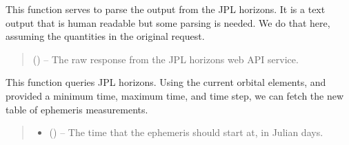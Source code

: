 \documentclass[letterpaper,11pt,english]{sphinxmanual}
\begin{document}
\begin{savenotes}
\begin{fulllineitems}
\begin{savenotes}\begin{fulllineitems}
\label{\detokenize{code/opihiexarata.ephemeris.jplhorizons:opihiexarata.ephemeris.jplhorizons.JPLHorizonsWebAPIEngine.__parse_jpl_horizons_output}}
\pysigstartsignatures
{}
\pysigstopsignatures
\sphinxAtStartPar
This function serves to parse the output from the JPL horizons. It
is a text output that is human readable but some parsing is needed.
We do that here, assuming the quantities in the original request.
\begin{quote}\begin{description}
\sphinxAtStartPar
{} () – The raw response from the JPL horizons web API service.

\end{description}\end{quote}

\end{fulllineitems}\end{savenotes}


\begin{savenotes}\begin{fulllineitems}
\label{\detokenize{code/opihiexarata.ephemeris.jplhorizons:opihiexarata.ephemeris.jplhorizons.JPLHorizonsWebAPIEngine._query_jpl_horizons}}
\pysigstartsignatures
{}
\pysigstopsignatures
\sphinxAtStartPar
This function queries JPL horizons. Using the current orbital
elements, and provided a minimum time, maximum time, and time step,
we can fetch the new table of ephemeris measurements.
\begin{quote}\begin{description}
\begin{itemize}
\item {} 
\sphinxAtStartPar
{} () – The time that the ephemeris should start at, in Julian days.


\end{itemize}
\end{description}
\end{quote}
\end{fulllineitems}
\end{savenotes}
\end{fulllineitems}
\end{savenotes}
\end{document}
